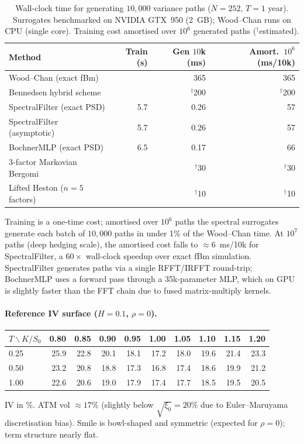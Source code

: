 \documentclass[11pt,a4paper]{article}
\begin{document}
\begin{table}[h]
\centering
\caption{Wall-clock time for generating $10{,}000$ variance paths
($N=252$, $T=1$ year). Surrogates benchmarked on NVIDIA GTX~950 (2~GB);
Wood--Chan runs on CPU (single core).
Training cost amortised over $10^6$ generated paths (${}^\dagger$estimated).}
\label{tab:timing}
\begin{tabular}{lrrr}
\toprule
Method & Train (s) & Gen $10$k (ms) & Amort.\ $10^6$ (ms/10k) \\
\midrule
Wood--Chan (exact fBm)   &  & 365  & 365   \\
Bennedsen hybrid scheme   &  & ${}^\dagger$200 & ${}^\dagger$200 \\
SpectralFilter (exact PSD) & 5.7 & 0.26 & 57   \\
SpectralFilter (asymptotic) & 5.7 & 0.26 & 57   \\
BochnerMLP (exact PSD)   & 6.5 & 0.17 & 66   \\
\midrule
3-factor Markovian Bergomi &  & ${}^\dagger$30 & ${}^\dagger$30 \\
Lifted Heston ($n=5$ factors)&  & ${}^\dagger$10 & ${}^\dagger$10 \\
\bottomrule
\end{tabular}
\end{table}

Training is a one-time cost; amortised over $10^6$ paths the spectral
surrogates generate each batch of $10{,}000$ paths in under 1\% of the
Wood--Chan time. At $10^7$ paths (deep hedging scale), the amortised
cost falls to $\approx 6$~ms/10k for SpectralFilter, a $60\times$
wall-clock speedup over exact fBm simulation. SpectralFilter generates
paths via a single RFFT/IRFFT round-trip; BochnerMLP uses a forward pass
through a 35k-parameter MLP, which on GPU is slightly faster than the FFT
chain due to fused matrix-multiply kernels.

\paragraph{Reference IV surface ($H=0.1$, $\rho=0$).}
\begin{center}
\begin{tabular}{lrrrrrrrrr}
\toprule
$T \backslash K/S_0$ & 0.80 & 0.85 & 0.90 & 0.95 & 1.00 & 1.05 & 1.10 & 1.15 & 1.20 \\
\midrule
0.25 & 25.9 & 22.8 & 20.1 & 18.1 & 17.2 & 18.0 & 19.6 & 21.4 & 23.3 \\
0.50 & 23.2 & 20.8 & 18.8 & 17.3 & 16.8 & 17.4 & 18.6 & 19.9 & 21.2 \\
1.00 & 22.6 & 20.6 & 19.0 & 17.9 & 17.4 & 17.7 & 18.5 & 19.5 & 20.5 \\
\bottomrule
\end{tabular}
\end{center}
IV in \%. ATM vol $\approx 17\%$ (slightly below $\sqrt{\xi_0} = 20\%$
due to Euler--Maruyama discretisation bias). Smile is bowl-shaped and
symmetric (expected for $\rho=0$); term structure nearly flat.
\end{document}
